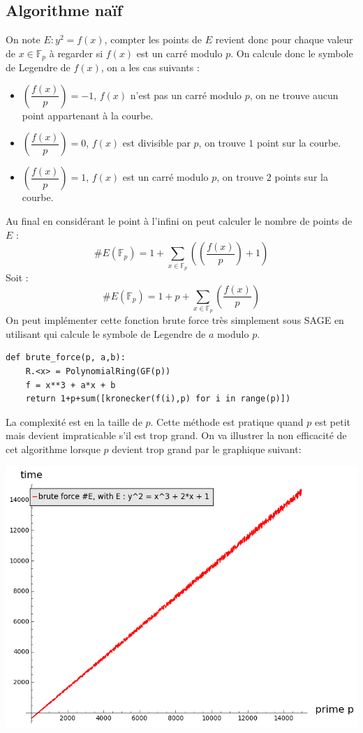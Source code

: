 \documentclass[12pt]{article}
\begin{document}
\subsection{Algorithme naïf}
On note $E: y^2 = f(x)$, compter les points de $E$ revient donc pour chaque valeur de $x \in \mathbb{F}_p$ à regarder si $f(x)$ est un carré modulo $p$. On calcule donc le symbole de Legendre de $f(x)$, on a les cas suivants : 
\begin{itemize}
\item  $\genfrac(){}{0}{f(x)}{p} = -1$, $f(x)$ n'est pas un carré modulo $p$, on ne trouve aucun point appartenant à la courbe.
\item $\genfrac(){}{0}{f(x)}{p} = 0$, $f(x)$ est divisible par $p$, on trouve $1$ point sur la courbe.
\item $\genfrac(){}{0}{f(x)}{p} = 1$, $f(x)$ est un carré modulo $p$, on trouve $2$ points sur la courbe.
\end{itemize}
\medskip
Au final en considérant le point à l'infini on peut calculer le nombre de points de $E$ : 
\begin{equation*}
\#E(\mathbb{F}_p) = 1 + \sum_{x \in \mathbb{F}_p}(\genfrac(){}{0}{f(x)}{p} + 1)
\end{equation*}
Soit : 
\begin{equation}
\#E(\mathbb{F}_p) = 1 + p +\sum_{x \in \mathbb{F}_p}\genfrac(){}{0}{f(x)}{p}
\end{equation}
On peut implémenter cette fonction brute force très simplement sous SAGE en utilisant  qui calcule le symbole de Legendre de $a$ modulo $p$.
\medskip
\begin{lstlisting}
def brute_force(p, a,b):
    R.<x> = PolynomialRing(GF(p))
    f = x**3 + a*x + b
    return 1+p+sum([kronecker(f(i),p) for i in range(p)])

\end{lstlisting}

\bigskip
La complexité est en la taille de $p$. Cette méthode est pratique quand $p$ est petit mais devient impraticable s'il est trop grand.
On va illustrer la non efficacité de cet algorithme lorsque $p$ devient trop grand par le graphique suivant:

\includegraphics[scale=0.5]{pictures/brute_force_cputime.png} 
\end{document}
